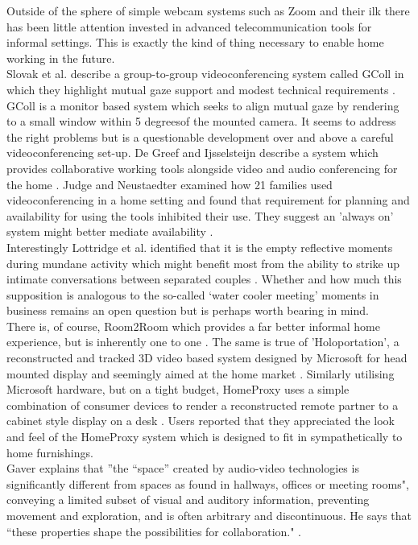 Outside of the sphere of simple webcam systems such as Zoom and their ilk there has been little attention invested in advanced telecommunication tools for informal settings. This is exactly the kind of thing necessary to enable home working in the future.\\
Slovak et al. describe a group-to-group videoconferencing system called GColl in which they highlight mutual gaze support and modest technical requirements \cite{Slovak2009}. GColl is a monitor based system which seeks to align mutual gaze by rendering to a small window within 5 degreesof the mounted camera. It seems to address the right problems but is a questionable development over and above a careful videoconferencing set-up. De Greef and Ijsselsteijn describe a system which provides collaborative working tools alongside video and audio conferencing for the home \cite{DeGreef2001}. Judge and Neustaedter examined how 21 families used videoconferencing in a home setting and found that requirement for planning and availability for using the tools inhibited their use. They suggest an 'always on' system might better mediate availability \cite{Judge2010}. \\
Interestingly Lottridge et al. identified that it is the empty reflective moments during mundane activity which might benefit most from the ability to strike up intimate conversations between separated couples \cite{Lottridge2009}. Whether and how much this supposition is analogous to the so-called `water cooler meeting' moments in business remains an open question but is perhaps worth bearing in mind.\\
There is, of course, Room2Room which provides a far better informal home experience, but is inherently one to one \cite{Pejsa2016}. The same is true of 'Holoportation', a reconstructed and tracked 3D video based system designed by Microsoft for head mounted display and seemingly aimed at the home market \cite{orts2016holoportation}. Similarly utilising Microsoft hardware, but on a tight budget, HomeProxy uses a simple combination of consumer devices to render a reconstructed remote partner to a cabinet style display on a desk \cite{Tang2013}. Users reported that they appreciated the look and feel of the HomeProxy system which is designed to fit in sympathetically to home furnishings.\\
Gaver explains that ''the “space” created by audio-video technologies is significantly different from spaces as found in hallways, offices or meeting rooms", conveying a limited subset of visual and auditory information, preventing movement and exploration, and is often arbitrary and discontinuous. He says that ``these properties shape the possibilities for collaboration." \cite{Gaver1992}.\\
